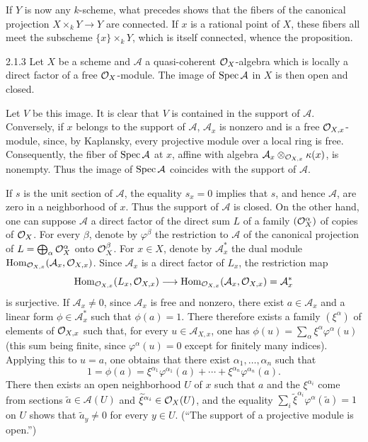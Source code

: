 If $Y$ is now any $k$-scheme, what precedes shows that the fibers of the canonical projection $X\times_kY\to Y$ are connected. If $x$ is a rational point of $X$, these fibers all meet the subscheme $\{x\}\times_kY$, which is itself connected, whence the proposition.
\begin{lemma}{2.1.3}\label{VIA.2.1.3}
Let $X$ be a scheme and $\mathcal A$ a quasi-coherent $\mathcal{O}_X$-algebra which is locally a direct factor of a free $\mathcal{O}_X$-module. The image of $\operatorname{Spec}\mathcal A$ in $X$ is then open and closed.
\end{lemma}
Let $V$ be this image. It is clear that $V$ is contained in the support of $\mathcal A$. Conversely, if $x$ belongs to the support of $\mathcal A$, $\mathcal A_x$ is nonzero and is a free $\mathcal{O}_{X,x}$-module, since, by Kaplansky, every projective module over a local ring is free. Consequently, the fiber of $\operatorname{Spec}\mathcal A$ at $x$, affine with algebra $\mathcal A_x\otimes_{\mathcal{O}_{X,x}}\kappa(x)$, is nonempty. Thus the image of $\operatorname{Spec}\mathcal A$ coincides with the support of $\mathcal A$.

If $s$ is the unit section of $\mathcal A$, the equality $s_x=0$ implies that $s$, and hence $\mathcal A$, are zero in a neighborhood of $x$. Thus the support of $\mathcal A$ is closed. On the other hand, one can suppose $\mathcal A$ a direct factor of the direct sum $L$ of a family $(\mathcal{O}_X^\alpha)$ of copies of $\mathcal{O}_X$. For every $\beta$, denote by $\varphi^\beta$ the restriction to $\mathcal A$ of the canonical projection of $L=\bigoplus_\alpha\mathcal{O}_X^\alpha$ onto $\mathcal{O}_X^\beta$. For $x\in X$, denote by $\mathcal A_x^*$ the dual module $\operatorname{Hom}_{\mathcal{O}_{X,x}}(\mathcal A_x,\mathcal{O}_{X,x})$. Since $\mathcal A_x$ is a direct factor of $L_x$, the restriction map
\[
\operatorname{Hom}_{\mathcal{O}_{X,x}}(L_x,\mathcal{O}_{X,x})\longrightarrow\operatorname{Hom}_{\mathcal{O}_{X,x}}(\mathcal A_x,\mathcal{O}_{X,x})=\mathcal A_x^*
\]
is surjective. If $\mathcal A_x\ne0$, since $\mathcal A_x$ is free and nonzero, there exist $a\in\mathcal A_x$ and a linear form $\phi\in\mathcal A_x^*$ such that $\phi(a)=1$. There therefore exists a family $(\xi^\alpha)$ of elements of $\mathcal{O}_{X,x}$ such that, for every $u\in\mathcal A_{X,x}$, one has $\phi(u)=\sum_\alpha\xi^\alpha\varphi^\alpha(u)$ (this sum being finite, since $\varphi^\alpha(u)=0$ except for finitely many indices). Applying this to $u=a$, one obtains that there exist $\alpha_1,\ldots,\alpha_n$ such that
\[
1=\phi(a)=\xi^{\alpha_1}\varphi^{\alpha_1}(a)+\cdots+\xi^{\alpha_n}\varphi^{\alpha_n}(a).
\]
There then exists an open neighborhood $U$ of $x$ such that $a$ and the $\xi^{\alpha_i}$ come from sections $\widetilde a\in\mathcal A(U)$ and $\widetilde\xi^{\alpha_i}\in\mathcal{O}_X(U)$, and the equality $\sum_i\widetilde\xi^{\alpha_i}\varphi^{\alpha}(\widetilde a)=1$ on $U$ shows that $\widetilde a_y\ne0$ for every $y\in U$. (``The support of a projective module is open.'')

